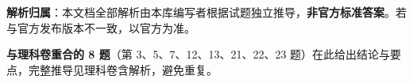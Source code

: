 

\begin{gknotice}
\textbf{解析归属}：本文档全部解析由本库编写者根据试题独立推导，\textbf{非官方标准答案}。若与官方发布版本不一致，以官方为准。

\textbf{与理科卷重合的 8 题}（第 3、5、7、12、13、21、22、23 题）在此给出结论与要点，完整推导见理科卷含解析，避免重复。
\end{gknotice}

\par\medskip


